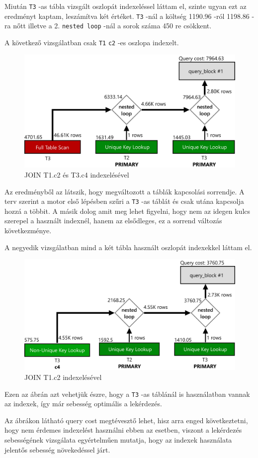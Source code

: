 Miután \texttt{T3} -as tábla vizsgált oszlopát indexeléssel láttam el, szinte ugyan ezt az eredményt kaptam, leszámítva két értéket. \texttt{T3} -nál a költség 1190.96 -ról 1198.86 -ra nőtt illetve a 2. \texttt{nested loop} -nál a sorok száma 450 re csökkent.

\newpage
A következő vizsgálatban csak \texttt{T1} \texttt{c2} -es oszlopa indexelt.

\begin{figure}[h!]
\centering
\includegraphics[width=14cm]{images/explain/3-2.png}
\caption{JOIN T1.c2 és T3.c4 indexelésével}
\label{fig:schema}
\end{figure}
Az eredményből az látszik, hogy megváltozott a táblák kapcsolási sorrendje. A terv szerint a motor első lépésben szűri a \texttt{T3} -as táblát és csak utána kapcsolja hozzá a többit. A másik dolog amit meg lehet figyelni, hogy nem az idegen kulcs szerepel a használt indexnél, hanem az elsődleges, ez a sorrend változás következménye.

A negyedik vizsgálatban mind a két tábla használt oszlopát indexekkel láttam el.
\begin{figure}[h!]
\centering
\includegraphics[width=14cm]{images/explain/3-3.png}
\caption{JOIN T1.c2 indexelésével}
\label{fig:schema}
\end{figure}
Ezen az ábrán azt vehetjük észre, hogy a \texttt{T3} -as táblánál is használatban vannak az indexek, így már sebesség optimális a lekérdezés.

Az ábrákon látható query cost megtévesztő lehet, hisz arra enged következtetni, hogy nem érdemes indexelést használni ebben az esetben, viszont a lekérdezés sebességének vizsgálata egyértelműen mutatja, hogy az indexek használata jelentős sebesség növekedéssel járt. 

